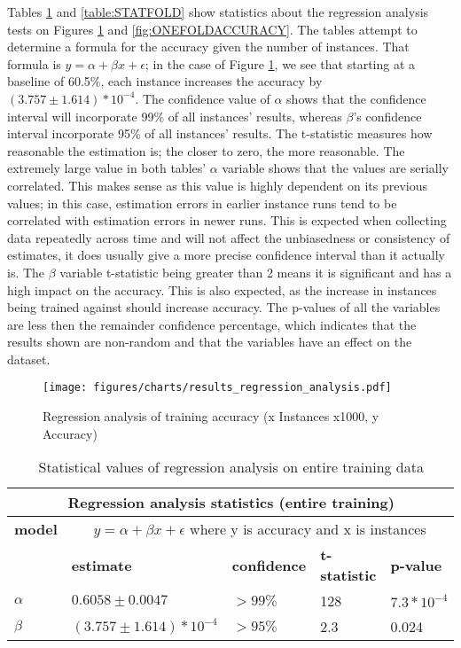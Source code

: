 Tables \ref{table:STATENTIRE} and \ref{table:STATFOLD} show statistics about the 
regression analysis tests on Figures \ref{fig:OVERALLTRAININGACCURACY} and 
\ref{fig:ONEFOLDACCURACY}. The tables attempt to determine a formula for the 
accuracy given the number of instances. That formula is $y = \alpha + \beta x + \epsilon$;
in the case of Figure \ref{fig:OVERALLTRAININGACCURACY}, we see that starting at 
a baseline of 60.5\%, each instance increases the accuracy by $(3.757\pm1.614)*10^{-4}$.
The confidence value of $\alpha$ shows that the confidence interval will 
incorporate 99\% of all instances' results, whereas $\beta$'s confidence interval
incorporate 95\% of all instances' results.  The t-statistic measures how 
reasonable the estimation is; the closer to zero, the more reasonable. The 
extremely large value in both tables' $\alpha$ variable shows that the values are 
serially correlated.  This makes sense as this value is highly dependent on its 
previous values; in this case, estimation errors in earlier instance runs tend to 
be correlated with estimation errors in newer runs. This is expected when 
collecting data repeatedly across time and will not affect the unbiasedness or 
consistency of estimates, it does usually give a more precise confidence interval 
than it actually is.  The $\beta$ variable t-statistic being greater than 2 means 
it is significant and has a high impact on the accuracy.  This is also expected, 
as the increase in instances being trained against should increase accuracy. The 
p-values of all the variables are less then the remainder confidence percentage, 
which indicates that the results shown are non-random and that the variables have an 
effect on the dataset.

\begin{figure}[htp]
	\begin{center}
		\texttt{[image: figures/charts/results\_regression\_analysis.pdf]}
		\caption{Regression analysis of training accuracy (x Instances x1000, y Accuracy) \label{fig:OVERALLTRAININGACCURACY}}
	\end{center}
\end{figure}

\begin{table}[htp]
	\begin{tabular}{|l|l|l|l|l|}
		\hline \multicolumn{5}{|c|}{\bf Regression analysis statistics (entire training) } \\ \hline
			{\bf model} & \multicolumn{4}{|c|}{$y = \alpha + \beta x + \epsilon$ where y is accuracy and x is instances} \\ \hline
		            & {\bf estimate} & {\bf confidence} & {\bf t-statistic} & {\bf p-value } \\ \hline
		{\bf $\alpha$}    & $0.6058\pm0.0047$   & $>99\%$            & 128         & $7.3*10^{-4}$ \\ \hline
		{\bf $\beta$}     & $(3.757\pm1.614)*10^{-4}$ & $>95\%$        & 2.3         & 0.024 \\ \hline
		\end{tabular}
		\caption{Statistical values of regression analysis on entire training data}
		\label{table:STATENTIRE}       
\end{table}

